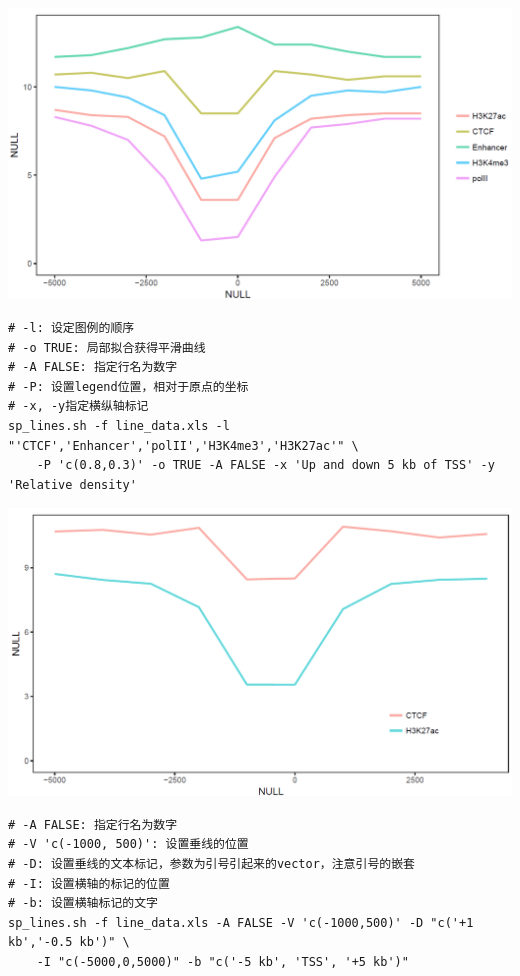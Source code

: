 \documentclass[]{article}
\numberwithin{figure}{section}
\numberwithin{table}{section}
\theoremstyle{definition}
\theoremstyle{definition}
\theoremstyle{definition}
\theoremstyle{remark}
\begin{document}
\begin{center}\includegraphics[width=0.95\linewidth,height=0.7\textheight,keepaspectratio]{images/line_9} \end{center}

\begin{verbatim}
# -l: 设定图例的顺序
# -o TRUE: 局部拟合获得平滑曲线
# -A FALSE: 指定行名为数字
# -P: 设置legend位置，相对于原点的坐标
# -x, -y指定横纵轴标记
sp_lines.sh -f line_data.xls -l "'CTCF','Enhancer','polII','H3K4me3','H3K27ac'" \
    -P 'c(0.8,0.3)' -o TRUE -A FALSE -x 'Up and down 5 kb of TSS' -y 'Relative density'
\end{verbatim}

\begin{center}\includegraphics[width=0.95\linewidth,height=0.7\textheight,keepaspectratio]{images/line_10} \end{center}

\begin{verbatim}
# -A FALSE: 指定行名为数字
# -V 'c(-1000, 500)': 设置垂线的位置
# -D: 设置垂线的文本标记，参数为引号引起来的vector，注意引号的嵌套
# -I: 设置横轴的标记的位置
# -b: 设置横轴标记的文字
sp_lines.sh -f line_data.xls -A FALSE -V 'c(-1000,500)' -D "c('+1 kb','-0.5 kb')" \
    -I "c(-5000,0,5000)" -b "c('-5 kb', 'TSS', '+5 kb')"
\end{verbatim}
\end{document}
